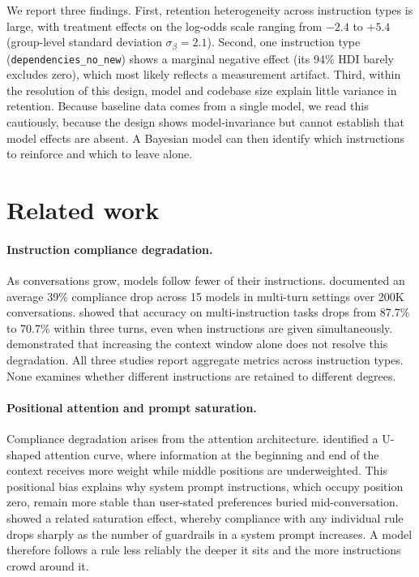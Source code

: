 \documentclass[a4paper]{llncs}
\begin{document}
We report three findings. First, retention heterogeneity across
instruction types is large, with treatment effects on the log-odds scale
ranging from $-2.4$ to $+5.4$ (group-level standard deviation
$\sigma_\beta = 2.1$). Second, one instruction type
(\texttt{dependencies\_no\_new}) shows a marginal negative effect (its
94\% HDI barely excludes zero), which most likely reflects a measurement
artifact. Third, within the resolution of this design,
model and codebase size explain little variance in retention. Because
baseline data comes from a single model, we read this cautiously, because
the design shows model-invariance but cannot establish that model effects
are absent. A Bayesian model can then identify which instructions to
reinforce and which to leave alone.


\section{Related work}
\label{sec:related}

\paragraph{Instruction compliance degradation.}
As conversations grow, models follow fewer of their instructions. \textcite{laban2025} documented an
average 39\% compliance drop across 15 models in multi-turn settings
over 200K conversations. \textcite{he2024} showed that accuracy on
multi-instruction tasks drops from 87.7\% to 70.7\% within three turns,
even when instructions are given simultaneously. \textcite{du2025}
demonstrated that increasing the context window alone does not resolve
this degradation. All three studies report aggregate metrics across
instruction types. None examines whether different instructions are retained
to different degrees.

\paragraph{Positional attention and prompt saturation.}
Compliance degradation arises from the attention architecture. \textcite{liu2024} identified a U-shaped attention
curve, where information at the beginning and end of the context receives
more weight while middle positions are underweighted. This positional bias
explains why system prompt instructions, which occupy position zero,
remain more stable than user-stated preferences buried mid-conversation.
\textcite{mu2025} showed a related saturation effect, whereby compliance
with any individual rule drops sharply as the number of guardrails in a
system prompt increases. A model therefore follows a rule less reliably the deeper it sits and
the more instructions crowd around it.
\end{document}
